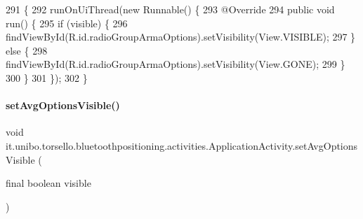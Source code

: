 \begin{DoxyCode}
291                                                               \{
292         runOnUiThread(\textcolor{keyword}{new} Runnable() \{
293             @Override
294             \textcolor{keyword}{public} \textcolor{keywordtype}{void} run() \{
295                 \textcolor{keywordflow}{if} (visible) \{
296                     findViewById(R.id.radioGroupArmaOptions).setVisibility(View.VISIBLE);
297                 \} \textcolor{keywordflow}{else} \{
298                     findViewById(R.id.radioGroupArmaOptions).setVisibility(View.GONE);
299                 \}
300             \}
301         \});
302     \}
\end{DoxyCode}
\hypertarget{classit_1_1unibo_1_1torsello_1_1bluetoothpositioning_1_1activities_1_1ApplicationActivity_ab50a70cb5d2d98211598b297a10bc44f_ab50a70cb5d2d98211598b297a10bc44f}{}\label{classit_1_1unibo_1_1torsello_1_1bluetoothpositioning_1_1activities_1_1ApplicationActivity_ab50a70cb5d2d98211598b297a10bc44f_ab50a70cb5d2d98211598b297a10bc44f} 
\paragraph{\texorpdfstring{set\+Avg\+Options\+Visible()}{setAvgOptionsVisible()}}
{\footnotesize\ttfamily void it.\+unibo.\+torsello.\+bluetoothpositioning.\+activities.\+Application\+Activity.\+set\+Avg\+Options\+Visible (\begin{DoxyParamCaption}\item[{final boolean}]{visible }\end{DoxyParamCaption})\hspace{0.3cm}{\ttfamily [private]}}



